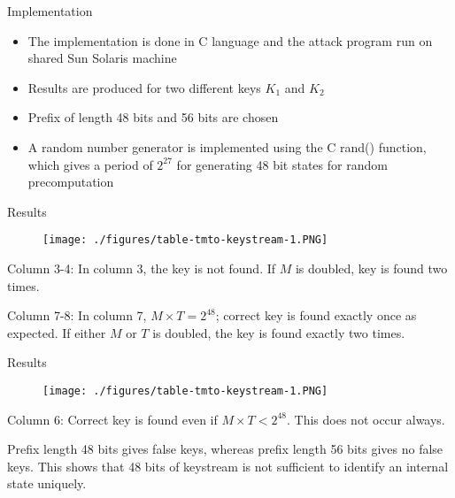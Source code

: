 \documentclass{beamer}
\begin{document}
\begin{frame}{Implementation}
\small{
\begin{itemize}
	\item The implementation is done in C language and the attack program run on shared Sun Solaris machine
	\item Results are produced for two different keys $K_1$ and $K_2$
	\item Prefix of length 48 bits and 56 bits are chosen
	\item A random number generator is implemented using the C rand() function, which gives a period of $2^{27}$ for generating 48 bit states for random precomputation
\end{itemize}
}
\end{frame}


\begin{frame}{Results}
	\begin{figure}[htp]
	\centering
	\texttt{[image: ./figures/table-tmto-keystream-1.PNG]}
	\end{figure}

\begin{itemize}
\small{	\item Column 3-4: In column 3, the key is not found. If $M$ is doubled, key is found two times.
	\item Column 7-8: In column 7, $M \times T = 2^{48}$; correct key is found exactly once as expected. If either $M$ or $T$ is doubled, the key is found exactly two times.}  
\end{itemize}

\end{frame}

\begin{frame}{Results}
	\begin{figure}[htp]
	\centering
	\texttt{[image: ./figures/table-tmto-keystream-1.PNG]}
	\end{figure}
\begin{itemize}
\small{
	\item Column 6: Correct key is found even if $M \times T < 2^{48}$. This does not occur always.
	\item Prefix length 48 bits gives false keys, whereas prefix length 56 bits gives no false keys. This shows that 48 bits of keystream is not sufficient to identify an internal state uniquely. }

\end{itemize}
\end{frame}
\end{document}
